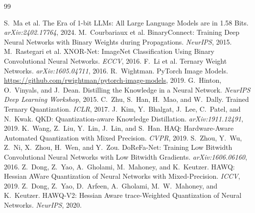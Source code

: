 


\begin{thebibliography}{99}

S.~Ma et al.
\newblock The Era of 1-bit LLMs: All Large Language Models are in 1.58 Bits.
\newblock \emph{arXiv:2402.17764}, 2024.
M.~Courbariaux et al.
\newblock BinaryConnect: Training Deep Neural Networks with Binary Weights during Propagations.
\newblock \emph{NeurIPS}, 2015.
M.~Rastegari et al.
\newblock XNOR-Net: ImageNet Classification Using Binary Convolutional Neural Networks.
\newblock \emph{ECCV}, 2016.
F.~Li et al.
\newblock Ternary Weight Networks.
\newblock \emph{arXiv:1605.04711}, 2016.
R.~Wightman.
\newblock PyTorch Image Models.
\newblock \url{https://github.com/rwightman/pytorch-image-models}, 2019.
G.~Hinton, O.~Vinyals, and J.~Dean.
\newblock Distilling the Knowledge in a Neural Network.
\newblock \emph{NeurIPS Deep Learning Workshop}, 2015.
C.~Zhu, S.~Han, H.~Mao, and W.~Dally.
\newblock Trained Ternary Quantization.
\newblock \emph{ICLR}, 2017.
J.~Kim, Y.~Bhalgat, J.~Lee, C.~Patel, and N.~Kwak.
\newblock QKD: Quantization-aware Knowledge Distillation.
\newblock \emph{arXiv:1911.12491}, 2019.
K.~Wang, Z.~Liu, Y.~Lin, J.~Lin, and S.~Han.
\newblock HAQ: Hardware-Aware Automated Quantization with Mixed Precision.
\newblock \emph{CVPR}, 2019.
S.~Zhou, Y.~Wu, Z.~Ni, X.~Zhou, H.~Wen, and Y.~Zou.
\newblock DoReFa-Net: Training Low Bitwidth Convolutional Neural Networks with Low Bitwidth Gradients.
\newblock \emph{arXiv:1606.06160}, 2016.
Z.~Dong, Z.~Yao, A.~Gholami, M.~Mahoney, and K.~Keutzer.
\newblock HAWQ: Hessian AWare Quantization of Neural Networks with Mixed-Precision.
\newblock \emph{ICCV}, 2019.
Z.~Dong, Z.~Yao, D.~Arfeen, A.~Gholami, M.~W.~Mahoney, and K.~Keutzer.
\newblock HAWQ-V2: Hessian Aware trace-Weighted Quantization of Neural Networks.
\newblock \emph{NeurIPS}, 2020.

\end{thebibliography}
